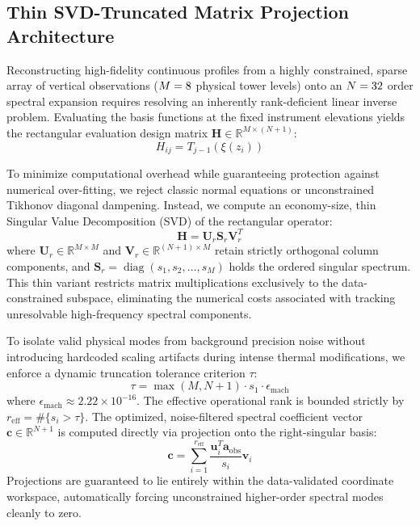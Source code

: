 \subsection{Thin SVD-Truncated Matrix Projection Architecture}
\label{sec:methods:svd}

Reconstructing high-fidelity continuous profiles from a highly constrained, sparse array of vertical observations ($M = 8$ physical tower levels) onto an $N=32$ order spectral expansion requires resolving an inherently rank-deficient linear inverse problem. Evaluating the basis functions at the fixed instrument elevations yields the rectangular evaluation design matrix $\mathbf{H} \in \mathbb{R}^{M \times (N+1)}$:
\begin{equation}
H_{ij} = T_{j-1}(\xi(z_i))
\label{eq:h_matrix_def}
\end{equation}

To minimize computational overhead while guaranteeing protection against numerical over-fitting, we reject classic normal equations or unconstrained Tikhonov diagonal dampening. Instead, we compute an economy-size, thin Singular Value Decomposition (SVD) of the rectangular operator:
\begin{equation}
\mathbf{H} = \mathbf{U}_r \mathbf{S}_r \mathbf{V}_r^T
\label{eq:thin_svd}
\end{equation}
where $\mathbf{U}_r \in \mathbb{R}^{M \times M}$ and $\mathbf{V}_r \in \mathbb{R}^{(N+1) \times M}$ retain strictly orthogonal column components, and $\mathbf{S}_r = \operatorname{diag}(s_1, s_2, \ldots, s_M)$ holds the ordered singular spectrum. This thin variant restricts matrix multiplications exclusively to the data-constrained subspace, eliminating the numerical costs associated with tracking unresolvable high-frequency spectral components.

To isolate valid physical modes from background precision noise without introducing hardcoded scaling artifacts during intense thermal modifications, we enforce a dynamic truncation tolerance criterion $\tau$:
\begin{equation}
\tau = \max(M, N+1) \cdot s_1 \cdot \epsilon_{\mathrm{mach}}
\label{eq:dynamic_tolerance}
\end{equation}
where $\epsilon_{\mathrm{mach}} \approx 2.22 \times 10^{-16}$. The effective operational rank is bounded strictly by $r_{\mathrm{eff}} = \#\{s_i > \tau\}$. The optimized, noise-filtered spectral coefficient vector $\mathbf{c} \in \mathbb{R}^{N+1}$ is computed directly via projection onto the right-singular basis:
\begin{equation}
\mathbf{c} = \sum_{i=1}^{r_{\mathrm{eff}}} \frac{\mathbf{u}_i^T \mathbf{a}_{\mathrm{obs}}}{s_i} \mathbf{v}_i
\label{eq:svd_reconstruction}
\end{equation}
Projections are guaranteed to lie entirely within the data-validated coordinate workspace, automatically forcing unconstrained higher-order spectral modes cleanly to zero.

